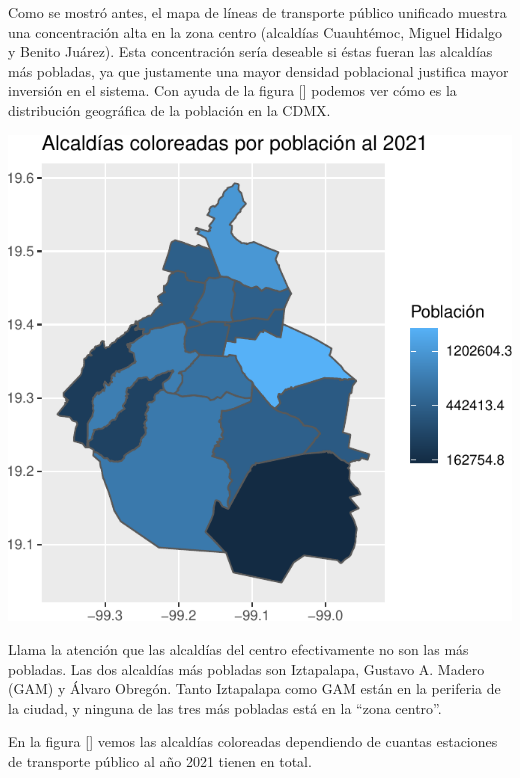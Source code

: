 \documentclass[
  spanish,
]{article}
\begin{document}
Como se mostró antes, el mapa de líneas de transporte público unificado
muestra una concentración alta en la zona centro (alcaldías Cuauhtémoc,
Miguel Hidalgo y Benito Juárez). Esta concentración sería deseable si
éstas fueran las alcaldías más pobladas, ya que justamente una mayor
densidad poblacional justifica mayor inversión en el sistema. Con ayuda
de la figura {[}{]} podemos ver cómo es la distribución geográfica de la
población en la CDMX.

\begin{center}\includegraphics{proyecto_files/figure-latex/unnamed-chunk-6-1} \end{center}

Llama la atención que las alcaldías del centro efectivamente no son las
más pobladas. Las dos alcaldías más pobladas son Iztapalapa, Gustavo A.
Madero (GAM) y Álvaro Obregón. Tanto Iztapalapa como GAM están en la
periferia de la ciudad, y ninguna de las tres más pobladas está en la
``zona centro''.

En la figura {[}{]} vemos las alcaldías coloreadas dependiendo de
cuantas estaciones de transporte público al año 2021 tienen en total.
\end{document}
